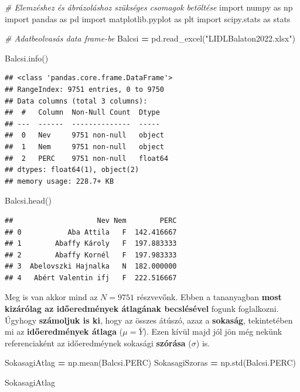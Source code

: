 \documentclass[
]{book}
\newenvironment{Shaded}{\begin{snugshade}}{\end{snugshade}}
\newcommand{\CommentTok}[1]{\textcolor[rgb]{0.56,0.35,0.01}{\textit{#1}}}
\newcommand{\ImportTok}[1]{#1}
\newcommand{\NormalTok}[1]{#1}
\newcommand{\OperatorTok}[1]{\textcolor[rgb]{0.81,0.36,0.00}{\textbf{#1}}}
\newcommand{\StringTok}[1]{\textcolor[rgb]{0.31,0.60,0.02}{#1}}
\begin{document}
\begin{Shaded}
\begin{Highlighting}[]
\CommentTok{\# Elemzéshez és ábrázoláshoz szükséges csomagok betöltése}
\ImportTok{import}\NormalTok{ numpy }\ImportTok{as}\NormalTok{ np}
\ImportTok{import}\NormalTok{ pandas }\ImportTok{as}\NormalTok{ pd}
\ImportTok{import}\NormalTok{ matplotlib.pyplot }\ImportTok{as}\NormalTok{ plt}
\ImportTok{import}\NormalTok{ scipy.stats }\ImportTok{as}\NormalTok{ stats}

\CommentTok{\# Adatbeolvasás data frame{-}be}
\NormalTok{Balcsi }\OperatorTok{=}\NormalTok{ pd.read\_excel(}\StringTok{"LIDLBalaton2022.xlsx"}\NormalTok{)}

\NormalTok{Balcsi.info()}
\end{Highlighting}
\end{Shaded}

\begin{verbatim}
## <class 'pandas.core.frame.DataFrame'>
## RangeIndex: 9751 entries, 0 to 9750
## Data columns (total 3 columns):
##  #   Column  Non-Null Count  Dtype  
## ---  ------  --------------  -----  
##  0   Nev     9751 non-null   object 
##  1   Nem     9751 non-null   object 
##  2   PERC    9751 non-null   float64
## dtypes: float64(1), object(2)
## memory usage: 228.7+ KB
\end{verbatim}

\begin{Shaded}
\begin{Highlighting}[]
\NormalTok{Balcsi.head()}
\end{Highlighting}
\end{Shaded}

\begin{verbatim}
##                    Nev Nem        PERC
## 0           Aba Attila   F  142.416667
## 1        Abaffy Károly   F  197.883333
## 2        Abaffy Kornél   F  197.983333
## 3  Abelovszki Hajnalka   N  182.000000
## 4   Abért Valentin ifj   F  222.516667
\end{verbatim}

Meg is van akkor mind az \(N=9751\) részvevőnk. Ebben a tananyagban \textbf{most kizárólag az időeredmények átlagának becslésével} fogunk foglalkozni.
Úgyhogy \textbf{számoljuk is ki}, hogy az összes átúszó, azaz a \textbf{sokaság}, tekintetében mi az \textbf{időeredmények átlaga} (\(\mu=\bar{Y}\)). Ezen kívül majd jól jön még nekünk referenciaként az időeredméynek sokasági \textbf{szórása} (\(\sigma\)) is.

\begin{Shaded}
\begin{Highlighting}[]
\NormalTok{SokasagiAtlag }\OperatorTok{=}\NormalTok{ np.mean(Balcsi.PERC)}
\NormalTok{SokasagiSzoras }\OperatorTok{=}\NormalTok{ np.std(Balcsi.PERC)}

\NormalTok{SokasagiAtlag}
\end{Highlighting}
\end{Shaded}
\end{document}
